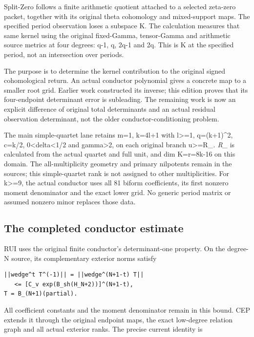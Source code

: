 \documentclass[
]{article}
\begin{document}
Split-Zero follows a finite arithmetic quotient attached to a selected
zeta-zero packet, together with its original theta cohomology and
mixed-support maps. The specified period observation loses a subspace K.
The calculation measures that same kernel using the original
fixed-Gamma, tensor-Gamma and arithmetic source metrics at four degrees:
q-1, q, 2q-1 and 2q. This is K at the specified period, not an
intersection over periods.

The purpose is to determine the kernel contribution to the original
signed cohomological return. An actual conductor polynomial gives a
concrete map to a smaller root grid. Earlier work constructed its
inverse; this edition proves that its four-endpoint determinant error is
subleading. The remaining work is now an explicit difference of original
total determinants and an actual residual observation determinant, not
the older conductor-conditioning problem.

The main simple-quartet lane retains m=1, k=4l+1 with l\textgreater=1,
q=(k+1)\^{}2, c=k/2, 0\textless delta\textless1/2 and
gamma\textgreater2, on each original branch
\textbar u\textbar\textgreater=R\_\emph{. R\_} is calculated from the
actual quartet and full unit, and dim K=r=8k-16 on this domain. The
all-multiplicity geometry and primary nilpotents remain in the sources;
this simple-quartet rank is not assigned to other multiplicities. For
k\textgreater=9, the actual conductor uses all 81 biform coefficients,
its first nonzero moment denominator and the exact lower grid. No
generic period matrix or assumed nonzero minor replaces those data.

\subsection{The completed conductor
estimate}\label{the-completed-conductor-estimate}

RUI uses the original finite conductor's determinant-one property. On
the degree-N source, its complementary exterior norms satisfy

\begin{verbatim}
||wedge^t T^(-1)|| = ||wedge^(N+1-t) T||
   <= [C_v exp(B_sh(H_N+2))]^(N+1-t),
T = B_(N+1)(partial).
\end{verbatim}

All coefficient constants and the moment denominator remain in this
bound. CEP extends it through the original endpoint maps, the exact
low-degree relation graph and all actual exterior ranks. The precise
current identity is
\end{document}
